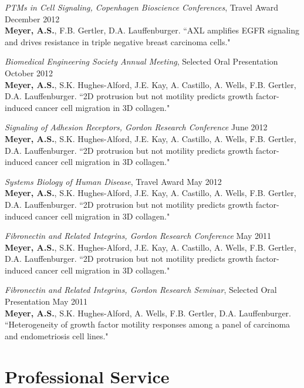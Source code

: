 \documentclass[11pt]{res}
\begin{document}
\begin{resume}
{\sl PTMs in Cell Signaling, Copenhagen Bioscience Conferences}, Travel Award \hfill December 2012 \\
{\bf Meyer, A.S.}, F.B. Gertler, D.A. Lauffenburger. ``AXL amplifies EGFR signaling and drives resistance in triple negative breast carcinoma cells."

{\sl Biomedical Engineering Society Annual Meeting}, Selected Oral Presentation \hfill October 2012 \\
{\bf Meyer, A.S.}, S.K. Hughes-Alford, J.E. Kay, A. Castillo, A. Wells, F.B. Gertler, D.A. Lauffenburger. ``2D protrusion but not motility predicts growth factor-induced cancer cell migration in 3D collagen."

{\sl Signaling of Adhesion Receptors, Gordon Research Conference} \hfill June 2012 \\
{\bf Meyer, A.S.}, S.K. Hughes-Alford, J.E. Kay, A. Castillo, A. Wells, F.B. Gertler, D.A. Lauffenburger. ``2D protrusion but not motility predicts growth factor-induced cancer cell migration in 3D collagen."

{\sl Systems Biology of Human Disease}, Travel Award \hfill May 2012 \\
{\bf Meyer, A.S.}, S.K. Hughes-Alford, J.E. Kay, A. Castillo, A. Wells, F.B. Gertler, D.A. Lauffenburger. ``2D protrusion but not motility predicts growth factor-induced cancer cell migration in 3D collagen."

{\sl Fibronectin and Related Integrins, Gordon Research Conference} \hfill May 2011 \\
{\bf Meyer, A.S.}, S.K. Hughes-Alford, J.E. Kay, A. Castillo, A. Wells, F.B. Gertler, D.A. Lauffenburger. ``2D protrusion but not motility predicts growth factor-induced cancer cell migration in 3D collagen."

{\sl Fibronectin and Related Integrins, Gordon Research Seminar}, Selected Oral Presentation \hfill May 2011 \\
{\bf Meyer, A.S.}, S.K. Hughes-Alford, A. Wells, F.B. Gertler, D.A. Lauffenburger. ``Heterogeneity of growth factor motility responses among a panel of carcinoma and endometriosis cell lines."

\section{Professional Service}


\end{resume}
\end{document}
